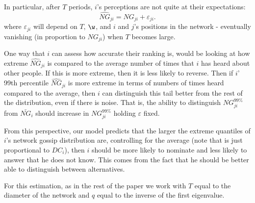  In particular, after $T$ periods, $i$'s perceptions are not quite at their expectations:
\[
\widehat{NG}_{ji} = NG_{ji} + \varepsilon_{ji}.
\]
where $\varepsilon_{ji}$ will depend on $T$, $\w$, and $i$ and $j$'s positions in the network - eventually vanishing (in proportion to $NG_{ji}$) when $T$ becomes large.

One way that $i$ can assess how accurate their ranking is, would be looking at how extreme $\widehat{NG}_{ji}$ is compared to the average number of times that $i$ has heard about other people. If this is more extreme, then it is less likely to reverse.
Then if $i$' 99th percentile $\widehat{NG}_{ji}$ is more extreme in terms of numbers of times heard compared to the average, then $i$ can distinguish this tail better from the rest of the distribution, even if there is noise. That is, the ability to distinguish $NG_{ji}^{99\%}$ from $\bar{NG}_i$ should increase in $NG_{ji}^{99\%}$ holding $\varepsilon$ fixed.

From this perspective, our model predicts that the larger the extreme quantiles of $i$'s network gossip distribution are, controlling for the average (note that is just proportional to $DC_i$), then $i$ should be more likely to nominate and less likely to answer that he does not know. This comes from the fact that he should be better able to distinguish between alternatives.

For this estimation, as in the rest of the paper we work with $T$ equal to the diameter of the network and $q$ equal to the inverse of the first eigenvalue.


\begin{table}[!h]
\centering
\caption{Does the tail of network gossip drive nominations?}\label{tab:dontknow}
\end{table}

